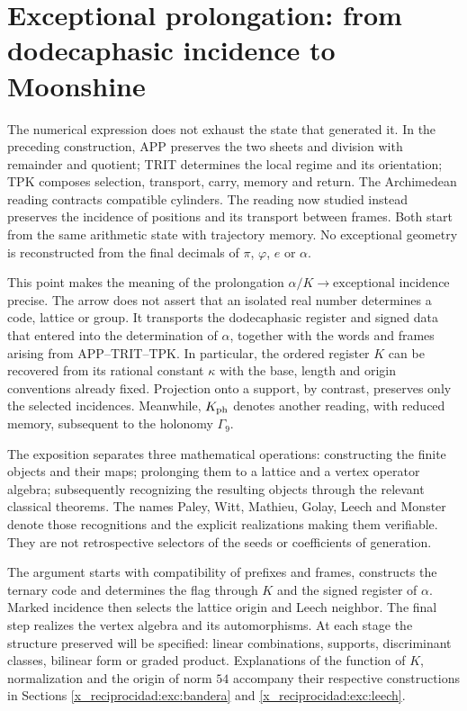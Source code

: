 \section{Exceptional prolongation: from dodecaphasic incidence to Moonshine}
\label{x_reciprocidad:exc:seccion}

The numerical expression does not exhaust the state that generated it. In the
preceding construction, APP preserves the two sheets and division with
remainder and quotient; TRIT determines the local regime and its orientation;
TPK composes selection, transport, carry, memory and return. The
Archimedean reading contracts compatible cylinders. The reading now
studied instead preserves the incidence of positions and its
transport between frames. Both start from the same arithmetic state with
trajectory memory. No
exceptional geometry is reconstructed from the final decimals
of $\pi$, $\varphi$, $e$ or $\alpha$.

This point makes the meaning of the prolongation
$\alpha/K\longrightarrow\text{exceptional incidence}$ precise. The arrow does not
assert that an isolated real number determines a code, lattice or
group. It transports the dodecaphasic register and signed data that
entered into the determination of $\alpha$, together with the words and
frames arising from APP--TRIT--TPK. In particular, the ordered register
$K$ can be recovered from its rational constant $\kappa$ with the
base, length and origin conventions already fixed. Projection onto a
support, by contrast, preserves only the selected incidences.
Meanwhile, $K_{\rm ph}$
denotes another reading, with reduced memory, subsequent to the holonomy
$\Gamma_9$.

The exposition separates three mathematical operations: constructing the finite
objects and their maps; prolonging them to a lattice and a vertex
operator algebra; subsequently recognizing the resulting objects through the relevant
classical theorems. The names Paley, Witt, Mathieu, Golay, Leech and
Monster denote those recognitions and the explicit realizations
making them verifiable. They are not retrospective selectors of the
seeds or coefficients of generation.


The argument starts with compatibility of prefixes and frames,
constructs the ternary code and determines the flag through \(K\) and the
signed register of \(\alpha\). Marked incidence then selects
the lattice origin and Leech neighbor. The final step realizes the vertex
algebra and its automorphisms. At each stage the structure preserved
will be specified: linear combinations, supports, discriminant classes, bilinear
form or graded product. Explanations of the function of \(K\),
normalization and the origin of norm \(54\) accompany their respective
constructions in Sections \ref{x_reciprocidad:exc:bandera} and \ref{x_reciprocidad:exc:leech}.

